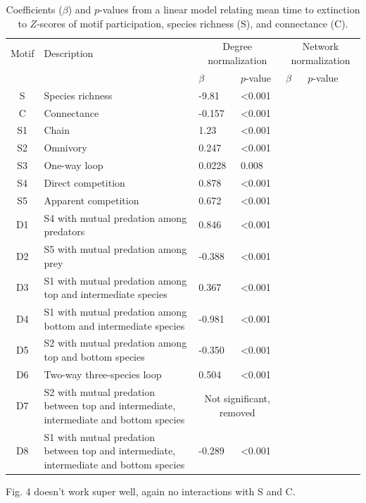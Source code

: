 \documentclass[12pt]{article}
\begin{document}
			\begin{table}
				\caption{Coefficients ($\beta$) and $p$-values from a linear model relating mean time to extinction to $Z$-scores of motif participation, species richness (S), and connectance (C). }
				\label{motif_lm}
				\begin{tabular}[h]{c | m{4cm} | l l | l l |}
				Motif & Description & \multicolumn{2}{c}{Degree normalization} &
									\multicolumn{2}{c}{Network normalization} \\
				& & $\beta$ & $p$-value & $\beta$ & $p$-value \\
				\hline
				S & Species richness & -9.81 & \textless0.001 \\
				C & Connectance & -0.157 & \textless0.001 \\
				S1 & Chain & 1.23 & \textless0.001 \\
				S2 & Omnivory & 0.247 & \textless0.001 \\
				S3 & One-way loop & 0.0228 & 0.008 \\
				S4 & Direct competition & 0.878 & \textless0.001 \\
				S5 & Apparent competition & 0.672 & \textless0.001 \\
				D1 & S4 with mutual predation among predators & 0.846 & \textless0.001 \\
				D2 & S5 with mutual predation among prey & -0.388 & \textless0.001 \\
				D3 & S1 with mutual predation among top and intermediate species & 0.367 & \textless0.001 \\
				D4 & S1 with mutual predation among bottom and intermediate species & -0.981 & \textless0.001 \\
				D5 & S2 with mutual predation among top and bottom species & -0.350 & \textless0.001 \\
				D6 & Two-way three-species loop & 0.504 & \textless0.001 \\
				D7 & S2 with mutual predation between top and intermediate, intermediate and bottom species & \multicolumn{2}{c|}{Not significant, removed} \\
				D8 & S1 with mutual predation between top and intermediate, intermediate and bottom species & -0.289 & \textless0.001 \\
				\hline
				\end{tabular}
				\end{table}



	Fig. 4 doesn't work super well, again no interactions with S and C.
\end{document}
